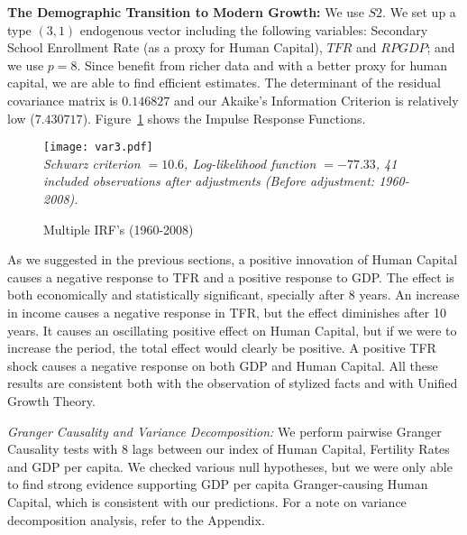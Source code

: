 \documentclass[12pt]{article}%
\begin{document}
\textbf{The Demographic Transition to Modern Growth:} We use $S2$. We set up a type $(3,1)$ endogenous vector including the following variables: Secondary School Enrollment Rate (as a proxy for Human Capital), $TFR$ and $RPGDP$; and we use $p=8$. Since benefit from richer data and with a better proxy for human capital, we are able to find efficient estimates. The determinant of the residual covariance matrix is $ 0.146827$ and our Akaike's Information Criterion is relatively low ($ 7.430717$). Figure~\ref{VAR3} shows the Impulse Response Functions.
\begin{figure}[h]
\caption{Multiple IRF's (1960-2008)}
\centering
\texttt{[image: var3.pdf]} \\
\footnotesize
\textit{Schwarz criterion $=10.6$, Log-likelihood function $=-77.33$, 41 included observations after adjustments (Before adjustment: 1960-2008).}
\label{VAR3}
\end{figure}
As we suggested in the previous sections, a positive innovation of Human Capital causes a negative response to TFR and a positive response to GDP. The effect is both economically and statistically significant, specially after 8 years. An increase in income causes a negative response in TFR, but the effect diminishes after 10 years. It causes an oscillating positive effect on Human Capital, but if we were to increase the period, the total effect would clearly be positive. A positive TFR shock causes a negative response on both GDP and Human Capital. All these results are consistent both with the observation of stylized facts and with Unified Growth Theory.

\emph{Granger Causality and Variance Decomposition:} We perform pairwise Granger Causality tests with 8 lags between our index of Human Capital, Fertility Rates and GDP per capita. We checked various null hypotheses, but we were only able to find strong evidence supporting GDP per capita Granger-causing Human Capital, which is consistent with our predictions. For a note on variance decomposition analysis, refer to the Appendix.
\end{document}
